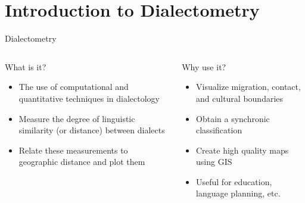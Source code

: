 \documentclass[presentation]{beamer}
\begin{document}
\section{Introduction to Dialectometry}
\label{sec:orgaa5f3eb}
\begin{frame}[label={sec:org0d33016}]{Dialectometry}
\begin{columns}
\begin{column}{0.5\columnwidth}
\begin{block}{What is it?}
\begin{itemize}
\item The use of computational and quantitative techniques in dialectology
\item Measure the degree of linguistic similarity (or distance) between dialects
\item Relate these measurements to geographic distance and plot them
\end{itemize}
\end{block}
\end{column}
\begin{column}{0.5\columnwidth}
\begin{block}{Why use it?}
\begin{itemize}
\item Visualize migration, contact, and cultural boundaries
\item Obtain a synchronic classification
\item Create high quality maps using GIS
\item Useful for education, language planning, etc.
\end{itemize}
\end{block}
\end{column}
\end{columns}
\end{frame}
\end{document}
